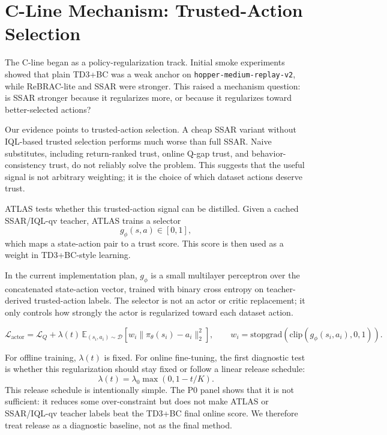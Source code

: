 \section{C-Line Mechanism: Trusted-Action Selection}

The C-line began as a policy-regularization track. Initial smoke experiments showed that plain TD3+BC was a weak anchor on \texttt{hopper-medium-replay-v2}, while ReBRAC-lite and SSAR were stronger. This raised a mechanism question: is SSAR stronger because it regularizes more, or because it regularizes toward better-selected actions?

Our evidence points to trusted-action selection. A cheap SSAR variant without IQL-based trusted selection performs much worse than full SSAR. Naive substitutes, including return-ranked trust, online Q-gap trust, and behavior-consistency trust, do not reliably solve the problem. This suggests that the useful signal is not arbitrary weighting; it is the choice of which dataset actions deserve trust.

ATLAS tests whether this trusted-action signal can be distilled. Given a cached SSAR/IQL-qv teacher, ATLAS trains a selector
\[
g_\phi(s,a) \in [0,1],
\]
which maps a state-action pair to a trust score. This score is then used as a weight in TD3+BC-style learning.

In the current implementation plan, $g_\phi$ is a small multilayer perceptron over the concatenated state-action vector, trained with binary cross entropy on teacher-derived trusted-action labels. The selector is not an actor or critic replacement; it only controls how strongly the actor is regularized toward each dataset action.

\[
\mathcal{L}_{\mathrm{actor}}
= \mathcal{L}_{Q}
+ \lambda(t)\,\mathbb{E}_{(s_i,a_i)\sim\mathcal{D}}
\left[
  w_i \lVert \pi_\theta(s_i) - a_i \rVert_2^2
\right],
\qquad
w_i = \mathrm{stopgrad}(\mathrm{clip}(g_\phi(s_i,a_i),0,1)).
\]

For offline training, $\lambda(t)$ is fixed. For online fine-tuning, the first diagnostic test is whether this regularization should stay fixed or follow a linear release schedule:
\[
\lambda(t) = \lambda_0 \max(0, 1 - t/K).
\]
This release schedule is intentionally simple. The P0 panel shows that it is not sufficient: it reduces some over-constraint but does not make ATLAS or SSAR/IQL-qv teacher labels beat the TD3+BC final online score. We therefore treat release as a diagnostic baseline, not as the final method.


